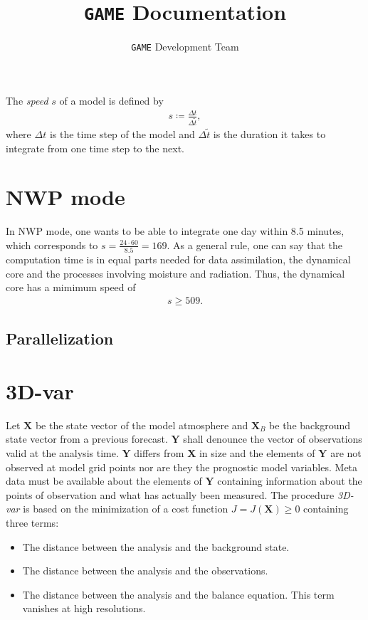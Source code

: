\documentclass{article}
\title{\texttt{GAME} Documentation}
\author{\texttt{GAME} Development Team}
\date{}
\begin{document}
\maketitle

The \textit{speed} $s$ of a model is defined by
%
\begin{eqnarray}
s \coloneqq \frac{\Delta t}{\Delta\tilde{t}},
\end{eqnarray}
%
where $\Delta t$ is the time step of the model and $\Delta\tilde{t}$ is the duration it takes to integrate from one time step to the next.

\section{NWP mode}
\label{sec:nwp_mode}

In NWP mode, one wants to be able to integrate one day within 8.5 minutes, which corresponds to $s = \frac{24\cdot 60}{8.5} = 169$. As a general rule, one can say that the computation time is in equal parts needed for data assimilation, the dynamical core and the processes involving moisture and radiation. Thus, the dynamical core has a mimimum speed of
%
\begin{eqnarray}
s \geq 509.
\end{eqnarray}

\subsection{Parallelization}
\label{sec:parallelization}

\section{3D-var}
\label{sec:3d-var}

Let $\mathbf{X}$ be the state vector of the model atmosphere and $\mathbf{X}_B$ be the background state vector from a previous forecast. $\mathbf{Y}$ shall denounce the vector of observations valid at the analysis time. $\mathbf{Y}$ differs from $\mathbf{X}$ in size and the elements of $\mathbf{Y}$ are not observed at model grid points nor are they the prognostic model variables. Meta data must be available about the elements of $\mathbf{Y}$ containing information about the points of observation and what has actually been measured. The procedure \textit{3D-var} is based on the minimization of a cost function $J = J\left(\mathbf{X}\right) \geq 0$ containing three terms:
%
\begin{itemize}
\item The distance between the analysis and the background state.
\item The distance between the analysis and the observations.
\item The distance between the analysis and the balance equation. This term vanishes at high resolutions.
\end{itemize}
\end{document}
